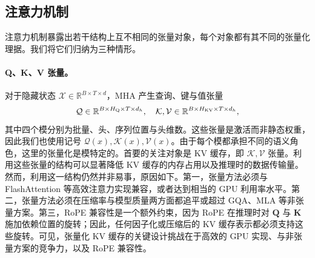 \documentclass[11pt]{article}
\newcommand{\R}{\mathbb{R}}
\newcommand{\ten}[1]{\mathcal{#1}}
\newcommand{\mat}[1]{\mathbf{#1}}
\begin{document}
\subsection{注意力机制}
\label{sec:component-att}

注意力机制暴露出若干结构上互不相同的张量对象，每个对象都有其不同的张量化理据。我们将它们归纳为三种情形。

\paragraph{Q、K、V 张量。}
对于隐藏状态 $\ten{X}\in\R^{B\times T\times d}$，MHA 产生查询、键与值张量
\begin{equation}
\ten{Q} \in \R^{B \times H_{\rm Q} \times T \times d_h}, \quad \ten{K},\ten{V}\in\R^{B\times H_{\rm KV}\times T\times d_h},
\end{equation}
其中四个模分别为批量、头、序列位置与头维数。这些张量是激活而非静态权重，因此我们也使用记号 $\ten{Q}(x), \ten{K}(x),\ten{V}(x)$。由于每个模都承担不同的语义角色，这里的张量化是模特定的。首要的关注对象是 KV 缓存，即 $\ten{K}, \ten{V}$ 张量。利用这些张量的结构可以显著降低 KV 缓存的内存占用以及推理时的数据传输量。
然而，利用这一结构仍然并非易事，原因如下。第一，张量方法必须与 FlashAttention \cite{dao2022flashattention} 等高效注意力实现兼容，或者达到相当的 GPU 利用率水平。第二，张量方法必须在压缩率与模型质量两方面都追平或超过 GQA、MLA 等非张量方案。第三，RoPE \cite{su2023rope} 兼容性是一个额外约束，因为 RoPE 在推理时对 $\mat{Q}$ 与 $\mat{K}$ 施加依赖位置的旋转；因此，任何因子化或压缩后的 KV 缓存表示都必须支持这些旋转。可见，张量化 KV 缓存的关键设计挑战在于高效的 GPU 实现、与非张量方案的竞争力，以及 RoPE 兼容性。


\end{document}
